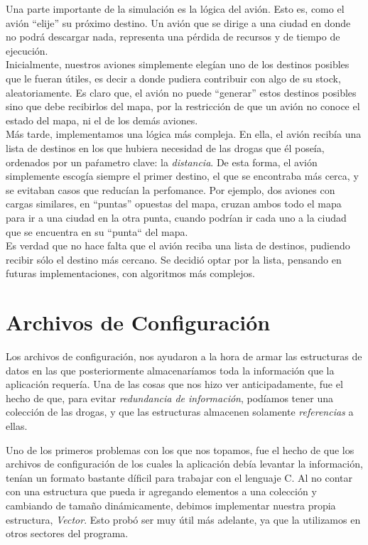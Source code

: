 \documentclass[a4paper,10pt]{article}
\begin{document}
Una parte importante de la simulación es la lógica del avión. Esto es, como el avión ``elije'' su próximo destino. Un avión que se dirige a una ciudad en donde no 
podrá descargar nada, representa una pérdida de recursos y de tiempo de ejecución.\\

Inicialmente, nuestros aviones simplemente elegían uno de los destinos posibles que le fueran útiles, es decir a donde pudiera contribuir con algo de su stock, 
aleatoriamente. Es claro que, el avión no puede ``generar'' estos destinos posibles sino que debe recibirlos del mapa, por la restricción de que un avión no 
conoce el estado del mapa, ni el de los demás aviones.\\

Más tarde, implementamos una lógica más compleja. En ella, el avión recibía una lista de destinos en los que hubiera necesidad de las drogas que él poseía, 
ordenados por un paŕametro clave: la \textit{distancia}. De esta forma, el avión simplemente escogía siempre el primer destino, el que se encontraba más cerca, y 
se evitaban casos que reducían la perfomance. Por ejemplo, dos aviones con cargas similares, en ``puntas'' opuestas del mapa, cruzan ambos todo el mapa para ir a una 
ciudad en la otra punta, cuando podrían ir cada uno a la ciudad que se encuentra en su ``punta`` del mapa.\\

Es verdad que no hace falta que el avión reciba una lista de destinos, pudiendo recibir sólo el destino más cercano. Se decidió optar por la lista, pensando en futuras
implementaciones, con algoritmos más complejos.

\newpage
\section{Archivos de Configuración}

Los archivos de configuración, nos ayudaron a la hora de armar las estructuras de datos en las que posteriormente almacenaríamos toda la información que la 
aplicación requería. Una de las cosas que nos hizo ver anticipadamente, fue el hecho de que, para evitar \textit{redundancia de información}, podíamos tener 
una colección de las drogas, y que las estructuras almacenen solamente \textit{referencias} a ellas. 

Uno de los primeros problemas con los que nos topamos, fue el hecho de que los archivos de configuración de los cuales la aplicación debía levantar la información,
 tenían un formato bastante díficil para trabajar con el lenguaje C. Al no contar con una estructura que pueda ir agregando elementos a una colección y cambiando 
de tamaño dinámicamente, debimos implementar nuestra propia estructura, \textit{Vector}. Esto probó ser muy útil más adelante, ya que la utilizamos en otros sectores 
del programa.\\
\end{document}
